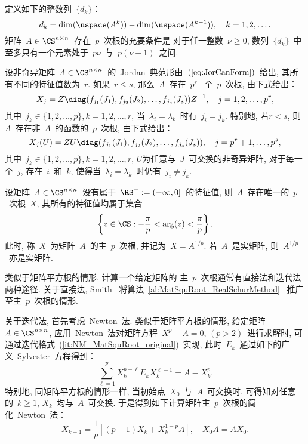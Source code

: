 \begin{theorem}
\label{th:MatpthRoor_existence} 定义如下的整数列~$\{d_k\}$：
$$
d_k = \dim(\nspace(A^k)) - \dim(\nspace(A^{k-1})),\quad
k=1,2,\ldots.
$$
矩阵~$A\in\CS^{n\times n}$~存在~$p$~次根的充要条件是
对于任一整数~$\nu\geq0$,
数列~$\{d_k\}$~中至多只有一个元素处于~$p\nu$~与~$p(\nu+1)$~之间.
\end{theorem}



\begin{theorem}
设非奇异矩阵~$A\in\CS^{n\times
n}$~的~Jordan~典范形由~$(\ref{eq:JorCanForm})$~给出,
其所有不同的特征值数为~$r$. 如果~$r\leq s$, 那么~$A$~存在~$p^r$~
个~$p$~次根, 由下式给出：
$$
X_j = Z \diag(f_{j_1}(J_1),f_{j_2}(J_2), \ldots,
f_{j_s}(J_s))Z^{-1},\quad j = 1,2,\ldots, p^r,
$$
其中~$j_k \in \{1,2,\ldots,p\}, k=1,2,\ldots,r$, 当~$\lambda_i =
\lambda_k$~时有~$j_i = j_k$. 特别地, 若$r < s$,
则~$A$~存在非~$A$~的函数的~$p$~次根, 由下式给出：
$$
X_j(U) = ZU\diag(f_{j_1}(J_1), f_{j_2}(J_2), \ldots, f_{j_s}(J_s)),
\quad j = p^r+1, \ldots, p^s,
$$
其中~$j_k \in \{1,2,\ldots,p\}, k=1,2,\ldots,r$,
$U$为任意与~$J$~可交换的非奇异矩阵, 对于每一个~$j$, 存在~$i$~和~$k$,
使得当~$\lambda_i = \lambda_k$~时仍有~$j_i \neq j_k$.
\end{theorem}


\begin{theorem}
\label{th:MatPricipalpthRoot} 设矩阵~$A\in\CS^{n\times
n}$~没有属于~$\RS^- := (-\infty,0]$~的特征值,
则~$A$~存在唯一的~$p$~次根~$X$, 其所有的特征值均属于集合
$$
\left\{z\in \CS: -\frac{\pi}{p} < \arg(z) < \frac{\pi}{p}\right\}.
$$
此时, 称~$X$~为矩阵~$A$~的主~$p$~次根, 并记为~$X = A^{1/p}$.
若~$A$~是实矩阵, 则~$A^{1/p}$~亦是实矩阵.
\end{theorem}

类似于矩阵平方根的情形, 计算一个给定矩阵的
主~$p$~次根通常有直接法和迭代法两种途径. 关于直接法, Smith
\cite{Smith2003}~将算法~\ref{al:MatSquRoot_RealSchurMethod}~
推广至主~$p$~次根的情形.

关于迭代法, 首先考虑~Newton~法. 类似于矩阵平方根的情形,
给定矩阵~$A\in\CS^{n\times n}$, 应用~Newton~法对矩阵方程~$X^p-A =
0,\, (p>2)$~进行求解时,
可通过迭代格式~(\ref{it:NM_MatSquRoot_original})~实现,
此时~$E_k$~通过如下的广义~Sylvester~方程得到：
$$
\sum_{\ell=1}^p X_k^{p-\ell} E_k X_k^{\ell-1} = A - X_k^p.
$$
特别地, 同矩阵平方根的情形一样, 当初始点~$X_0$~与~$A$~可交换时,
可得知对任意的~$k\geq 1$, $X_k$~均与~$A$~可交换.
于是得到如下计算矩阵主~$p$~次根的简化~Newton~法：
\begin{equation}
\label{it:NM_MatpthRoot_original} X_{k+1} = \frac{1}{p}[(p - 1)X_k +
X_k^{1-p}A], \quad X_0A = AX_0.
\end{equation}

